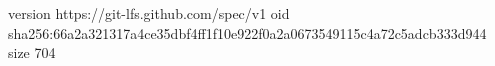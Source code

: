 version https://git-lfs.github.com/spec/v1
oid sha256:66a2a321317a4ce35dbf4ff1f10e922f0a2a0673549115c4a72c5adcb333d944
size 704
